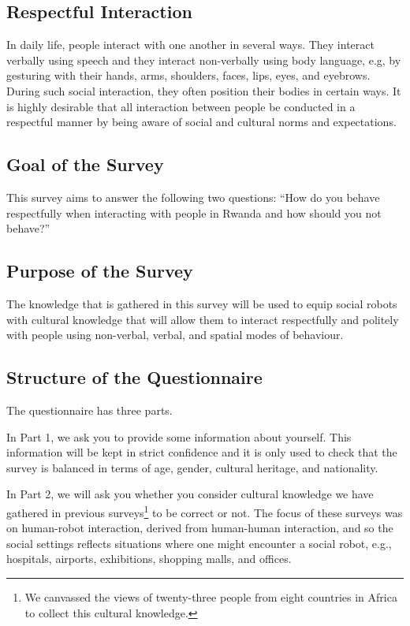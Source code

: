 \documentclass{CSSRforAfrica}
\begin{document}
\subsection*{Respectful Interaction}
In daily life, people interact with one another in several ways. They interact verbally using speech and they interact non-verbally using body language, e.g, by gesturing with their hands, arms, shoulders, faces, lips, eyes, and eyebrows.  During such social interaction, they often position their bodies in certain ways.  It is highly desirable that all interaction between people be conducted in a respectful manner by being aware of social and cultural norms and expectations. 

\subsection*{Goal of the Survey}
This survey aims to answer the following two questions: ``How do you behave respectfully  when interacting with people in Rwanda and how should you not behave?''   

\subsection*{Purpose of the Survey}
The knowledge that is gathered in this survey will be used to equip social robots with cultural knowledge that will allow them to interact respectfully and politely with people  using non-verbal,  verbal, and spatial modes of behaviour.

\subsection*{Structure of the Questionnaire}
The questionnaire has three parts. 

In Part 1, we ask you to provide some information about yourself.  This information will be kept in strict confidence and it is only used to check that the survey is balanced in terms of age, gender, cultural heritage, and nationality. 

In Part 2, we will ask you whether  you consider cultural knowledge we have gathered in previous surveys\footnote{We canvassed the views of twenty-three people from eight countries in Africa to  collect this cultural knowledge.} to be correct or not. The focus of these surveys was on human-robot interaction, derived from human-human interaction, and so the social settings reflects situations where one might encounter a social robot, e.g., hospitals, airports, exhibitions, shopping malls, and offices.
\end{document}
